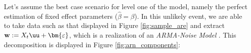 








 





Let's assume the best case scenario for level one of the model, namely the perfect estimation of fixed effect parameters ($\hat{\beta} = \beta$). In this unlikely event, we are able to take data such as that displayed in Figure \ref{fig:sample_are} and extract $\mathbf{w}:=X_t\uu + \bm{\varepsilon}$, which is a realization of an \textit{ARMA-Noise Model} \cite{WongMiller1990}. This decomposition is displayed in Figure \ref{fig:arn_components}:



